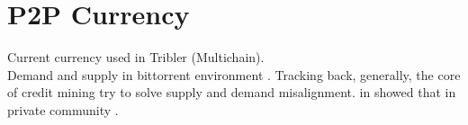 \section{P2P Currency}
Current currency used in Tribler (Multichain)\cite{2015:multichain:norberhuis}.\\ Demand and supply in bittorrent environment \cite{2009:demandsupplyres:andrade}.
Tracking back, generally, the core of credit mining try to solve supply and demand misalignment. \citeauthor{2011:interswarm:capota} in \citeyear{2011:interswarm:capota} showed that in private community \cite{2011:interswarm:capota}.